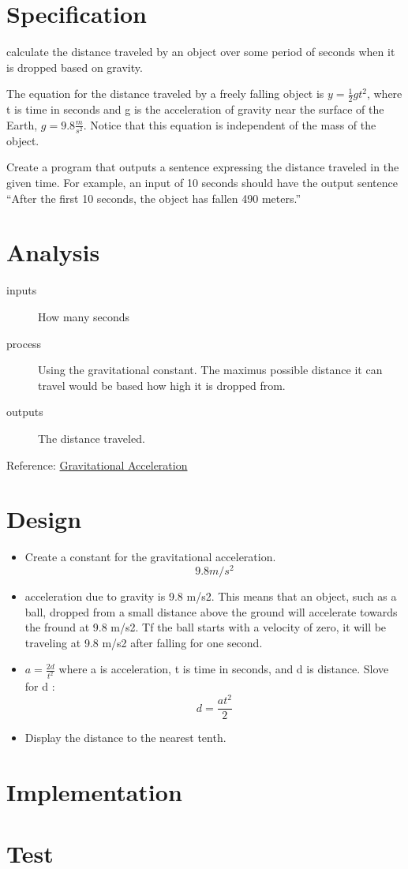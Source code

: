 \documentclass{article}
\begin{document}
\normalsize 
\section*{Specification}
calculate the distance traveled by an object over some period 
of seconds when it is dropped based on gravity.





The equation for the distance traveled by a freely falling object is  
$y = \frac{1}{2}gt^2$, where t is time in seconds 
and g is the acceleration of gravity near the surface of the Earth, 
$g = 9.8 \frac{m}{s^2}$. Notice that this equation is 
independent of the mass of the object.

Create a program that outputs a sentence expressing the distance traveled in the given time. For example, an input of 10 seconds should have the output sentence “After the first 10 seconds, the object has fallen 490 meters.”
\newpage\section*{Analysis}

\begin{description}
	\item [inputs]
	How many seconds
	\item [process] Using the gravitational constant.
	The maximus possible distance
	it can travel would be based how high it is dropped from.
	
	\item [outputs]
	The distance traveled.
\end{description}
Reference: 
\href{http://scienceprimer.com/gravitational-acceleration}{Gravitational Acceleration}
\newpage\section*{Design}

\begin{itemize}
	\item Create a constant for the gravitational acceleration.
	\[ 9.8 m/s^{2} \]
	\item acceleration due to gravity is 9.8 m/s2.
	This means that an object, such as a ball, dropped from a small
	distance above the ground will accelerate towards the fround at
	9.8 m/s2. Tf the ball starts with a velocity of zero, it will be
	traveling at 9.8 m/s2 after falling for one second.
	\item $a= \frac{2d}{t^{2}}$ where a is acceleration, t is time in
	seconds, and d is distance. Slove for d :
	\[ d = \frac{at^{2}}{2}  \]
	\item Display the distance to the nearest tenth.
\end{itemize}
\newpage\section*{Implementation}

\newpage\section*{Test}
\end{document}
